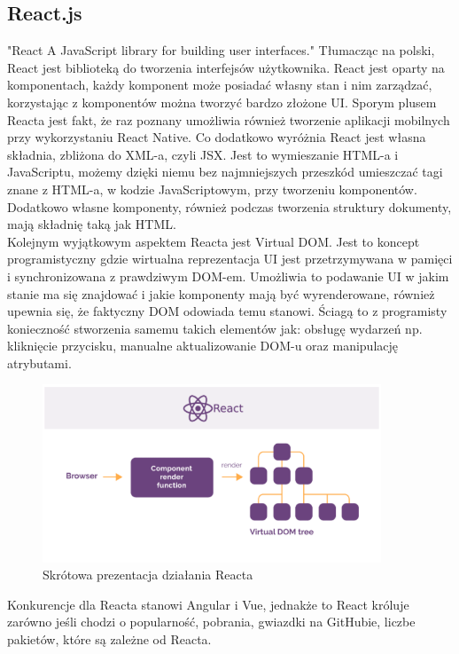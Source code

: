 \documentclass[12pt]{article}
\begin{document}
\begin{sloppypar}
{  \subsection{React.js}
  {
    "React A JavaScript library for building user interfaces."\cite{react} Tłumacząc na polski, React jest biblioteką do tworzenia interfejsów użytkownika. 
    React jest oparty na komponentach, każdy komponent może posiadać własny stan i nim zarządzać, korzystając z komponentów można tworzyć bardzo złożone UI. 
    Sporym plusem Reacta jest fakt, że raz poznany umożliwia również tworzenie aplikacji mobilnych przy wykorzystaniu React Native. Co dodatkowo wyróżnia React 
    jest własna składnia, zbliżona do XML-a, czyli JSX. Jest to wymieszanie HTML-a i JavaScriptu, możemy dzięki niemu bez najmniejszych przeszkód umieszczać 
    tagi znane z HTML-a, w kodzie JavaScriptowym, przy tworzeniu komponentów. Dodatkowo własne komponenty, również podczas tworzenia struktury dokumenty, mają 
    składnię taką jak HTML. \\
    Kolejnym wyjątkowym aspektem Reacta jest Virtual DOM. Jest to koncept programistyczny gdzie wirtualna reprezentacja UI jest 
    przetrzymywana w pamięci i synchronizowana z prawdziwym DOM-em. 
    Umożliwia to podawanie UI w jakim stanie ma się znajdować i jakie komponenty mają być wyrenderowane, również upewnia się, że faktyczny DOM odowiada temu stanowi. 
    Ściagą to z programisty konieczność stworzenia samemu takich elementów jak: obsługę wydarzeń np. kliknięcie przycisku, manualne aktualizowanie DOM-u oraz manipulację atrybutami.
    \begin{figure}[H]
      \centering
      \includegraphics[width=0.9\textwidth]{how_react_works.PNG}
      \caption{Skrótowa prezentacja działania Reacta}
      \label{fig:how-react-works}
    \end{figure}
    Konkurencje dla Reacta stanowi Angular i Vue, jednakże to React króluje zarówno jeśli chodzi o popularność, pobrania, gwiazdki na GitHubie, liczbe pakietów, które są zależne od Reacta. 
}}
\end{sloppypar}
\end{document}
